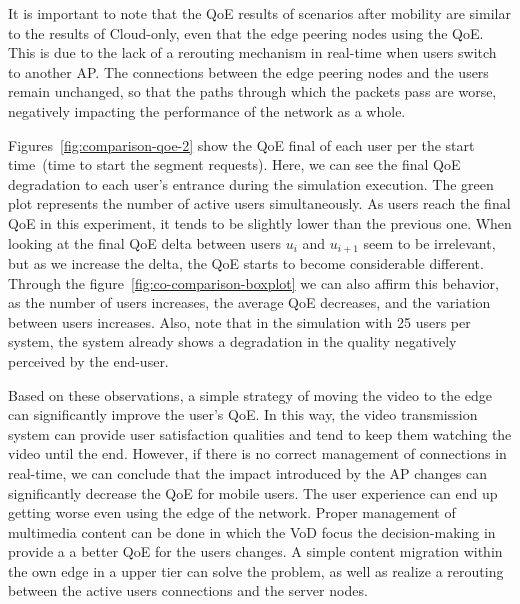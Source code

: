 It is important to note that the QoE results of scenarios after mobility are similar to the results of Cloud-only, even that the edge peering nodes using the QoE. This is due to the lack of a rerouting mechanism in real-time when users switch to another AP. The connections between the edge peering nodes and the users remain unchanged, so that the paths through which the packets pass are worse, negatively impacting the performance of the network as a whole.

Figures~\ref{fig:comparison-qoe-2} show the QoE final of each user per the start time~(time to start the segment requests). Here, we can see the final QoE degradation to each user's entrance during the simulation execution. The green plot represents the number of active users simultaneously.  
As users reach the final QoE in this experiment, it tends to be slightly lower than the previous one. When looking at the final QoE delta between users $u_{i}$ and $u_{i + 1}$ seem to be irrelevant, but as we increase the delta, the QoE starts to become considerable different. Through the figure~\ref{fig:co-comparison-boxplot} we can also affirm this behavior, as the number of users increases, the average QoE decreases, and the variation between users increases. Also, note that in the simulation with 25 users per system, the system already shows a degradation in the quality negatively perceived by the end-user.

Based on these observations,
a simple strategy of moving the video to the edge can significantly improve the user's QoE. In this way, the video transmission system can provide user satisfaction qualities and tend to keep them watching the video until the end.
However, if there is no correct management of connections in real-time, we can conclude that the impact introduced by the AP changes can significantly decrease the QoE for mobile users. The user experience can end up getting worse even using the edge of the network. Proper management of multimedia content can be done in which the VoD focus the decision-making in provide a a better QoE for the users changes. A simple content migration within the own edge in a upper tier can solve the problem, as well as realize a rerouting between the active users connections and the server nodes. 

